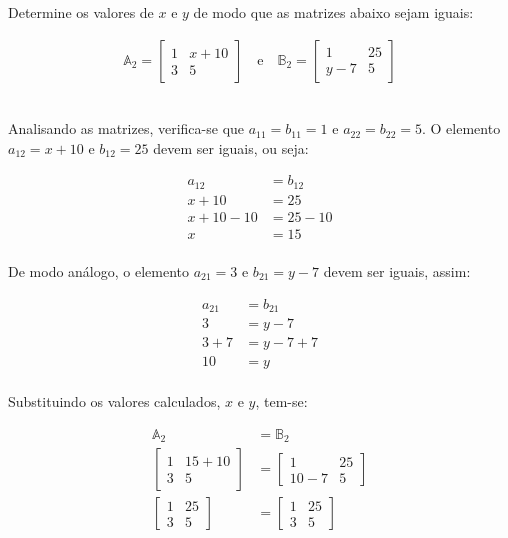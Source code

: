 \begin{example}
	Determine os valores de $x$ e $y$ de modo que as matrizes abaixo
	sejam iguais:

\begin{ceqn}
	\begin{align*}
	\mathbb{A}_{2}=\begin{bmatrix}1 & x+10\\
	3 & 5
	\end{bmatrix}\quad\mathrm{e}\quad\mathbb{B}_{2}=\begin{bmatrix}1 & 25\\
	y-7 & 5
	\end{bmatrix}
	\end{align*}
\end{ceqn}
\\
	Analisando as matrizes, verifica-se que $a_{11}=b_{11}=1$ e $a_{22}=b_{22}=5$.
	O elemento $a_{12}=x+10$ e $b_{12}=25$ devem ser iguais, ou seja:

\begin{ceqn}
	\begin{align*}
	a_{12} &= b_{12} \\
	x+10 &= 25 \\
	x+10-10 &= 25-10 \\
	x &= 15 \\
	\end{align*}
\end{ceqn}

De modo análogo, o elemento $a_{21}=3$ e $b_{21}=y-7$ devem ser iguais, assim:

\begin{ceqn}
	\begin{align*}
		a_{21} &=b_{21} \\
		3 &=y-7 \\
		3+7 &=y-7+7 \\
		10 &=y \\
	\end{align*}
\end{ceqn}

	Substituindo os valores calculados, $x$ e $y$, tem-se:

\begin{ceqn}
	\begin{align*}
		\mathbb{A}_{2} &= \mathbb{B}_{2}\\
		\begin{bmatrix}1 & 15+10\\
		3 & 5
		\end{bmatrix} &= \begin{bmatrix}1 & 25\\
		10-7 & 5
		\end{bmatrix}\\
		\begin{bmatrix}1 & 25\\
		3 & 5
		\end{bmatrix} &= \begin{bmatrix}1 & 25\\
		3 & 5
		\end{bmatrix}
	\end{align*}
\end{ceqn}

\end{example}

